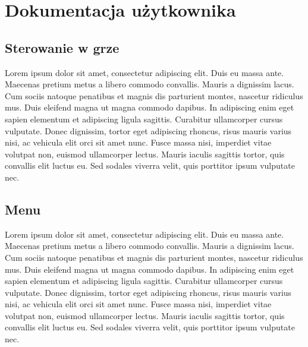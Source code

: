 \chapter{Dokumentacja użytkownika} 
\section{Sterowanie w grze}
Lorem ipsum dolor sit amet, consectetur adipiscing elit. Duis eu massa ante. Maecenas pretium metus a libero commodo convallis. Mauris a dignissim lacus. Cum sociis natoque penatibus et magnis dis parturient montes, nascetur ridiculus mus. Duis eleifend magna ut magna commodo dapibus. In adipiscing enim eget sapien elementum et adipiscing ligula sagittis. Curabitur ullamcorper cursus vulputate. Donec dignissim, tortor eget adipiscing rhoncus, risus mauris varius nisi, ac vehicula elit orci sit amet nunc. Fusce massa nisi, imperdiet vitae volutpat non, euismod ullamcorper lectus. Mauris iaculis sagittis tortor, quis convallis elit luctus eu. Sed sodales viverra velit, quis porttitor ipsum vulputate nec.


\section{Menu}
Lorem ipsum dolor sit amet, consectetur adipiscing elit. Duis eu massa ante. Maecenas pretium metus a libero commodo convallis. Mauris a dignissim lacus. Cum sociis natoque penatibus et magnis dis parturient montes, nascetur ridiculus mus. Duis eleifend magna ut magna commodo dapibus. In adipiscing enim eget sapien elementum et adipiscing ligula sagittis. Curabitur ullamcorper cursus vulputate. Donec dignissim, tortor eget adipiscing rhoncus, risus mauris varius nisi, ac vehicula elit orci sit amet nunc. Fusce massa nisi, imperdiet vitae volutpat non, euismod ullamcorper lectus. Mauris iaculis sagittis tortor, quis convallis elit luctus eu. Sed sodales viverra velit, quis porttitor ipsum vulputate nec.


